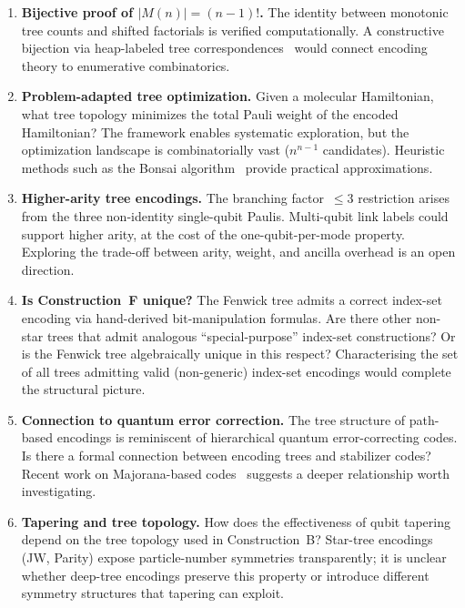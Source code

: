 \begin{enumerate}
  \item \textbf{Bijective proof of $|M(n)| = (n{-}1)!$.}
    The identity between monotonic tree counts and shifted factorials
    is verified computationally.  A constructive bijection via
    heap-labeled tree correspondences~\cite{bergeron1992} would
    connect encoding theory to enumerative combinatorics.

  \item \textbf{Problem-adapted tree optimization.}
    Given a molecular Hamiltonian, what tree topology minimizes the
    total Pauli weight of the encoded Hamiltonian?  The framework
    enables systematic exploration, but the optimization landscape
    is combinatorially vast ($n^{n-1}$ candidates).  Heuristic methods
    such as the Bonsai algorithm~\cite{miller2023bonsai} provide
    practical approximations.

  \item \textbf{Higher-arity tree encodings.}
    The branching factor~$\le 3$ restriction arises from the three
    non-identity single-qubit Paulis.  Multi-qubit link labels could
    support higher arity, at the cost of the one-qubit-per-mode
    property.  Exploring the trade-off between arity, weight, and
    ancilla overhead is an open direction.

  \item \textbf{Is Construction~F unique?}
    The Fenwick tree admits a correct index-set encoding via
    hand-derived bit-manipulation formulas.  Are there other
    non-star trees that admit analogous ``special-purpose''
    index-set constructions?  Or is the Fenwick tree algebraically
    unique in this respect?  Characterising the set of all trees
    admitting valid (non-generic) index-set encodings would
    complete the structural picture.

  \item \textbf{Connection to quantum error correction.}
    The tree structure of path-based encodings is reminiscent of
    hierarchical quantum error-correcting codes.  Is there a formal
    connection between encoding trees and stabilizer codes?  Recent
    work on Majorana-based codes~\cite{bravyi2002} suggests a deeper
    relationship worth investigating.

  \item \textbf{Tapering and tree topology.}
    How does the effectiveness of qubit
    tapering~\cite{bravyi2017tapering} depend on the tree topology
    used in Construction~B?  Star-tree encodings (JW, Parity) expose
    particle-number symmetries transparently; it is unclear whether
    deep-tree encodings preserve this property or introduce different
    symmetry structures that tapering can exploit.
\end{enumerate}

